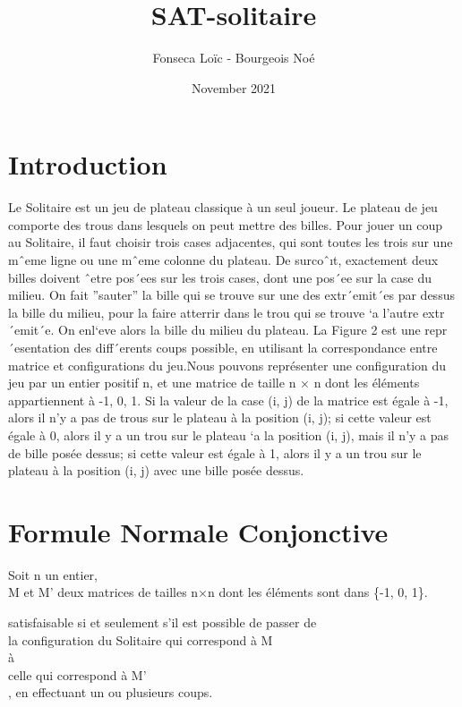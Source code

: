 \documentclass[utf8]{article}
\title{SAT-solitaire}
\author{Fonseca Loïc - Bourgeois Noé}
\date{November 2021}
\begin{document}
\maketitle
\tableofcontents

\newpage


\section{Introduction}
Le Solitaire est un jeu de plateau classique à un seul joueur. 
Le plateau de jeu comporte des trous dans lesquels on peut mettre des billes. 
Pour jouer un coup au Solitaire, il faut choisir trois cases adjacentes, qui sont
toutes les trois sur une mˆeme ligne ou une mˆeme colonne du plateau. De surcoˆıt,
exactement deux billes doivent ˆetre pos´ees sur les trois cases, dont une pos´ee sur
la case du milieu. On fait ”sauter” la bille qui se trouve sur une des extr´emit´es
par dessus la bille du milieu, pour la faire atterrir dans le trou qui se trouve `a
l’autre extr´emit´e. On enl`eve alors la bille du milieu du plateau. La Figure 2 est
une repr´esentation des diff´erents coups possible, en utilisant la correspondance
entre matrice et configurations du jeu.Nous pouvons représenter une configuration du jeu par un entier positif n, et
une matrice de taille n × n dont les éléments appartiennent à {-1, 0, 1}. Si la
valeur de la case (i, j) de la matrice est égale à -1, alors il n’y a pas de trous
sur le plateau à la position (i, j); si cette valeur est égale à 0, alors il y a un
trou sur le plateau `a la position (i, j), mais il n’y a pas de bille posée dessus; 
si cette valeur est égale à 1, alors il y a un trou sur le plateau à la position (i, j) avec une bille posée dessus.


\section{Formule Normale Conjonctive}
Soit n un entier, \\
M et M' deux matrices de tailles n×n 
dont les éléments sont dans \{-1, 0, 1\}. 

satisfaisable si et seulement s’il est possible de passer de\\
la configuration du Solitaire
qui correspond à M \\
à \\
celle qui correspond à M'\\
, en effectuant un ou
plusieurs coups. 
\end{document}
